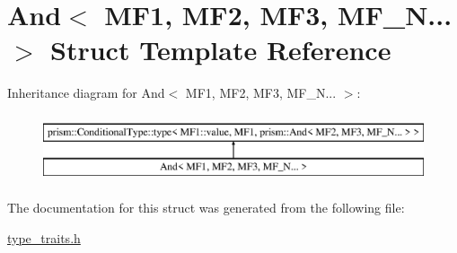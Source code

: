 \hypertarget{struct_and_3_01_m_f1_00_01_m_f2_00_01_m_f3_00_01_m_f___n_8_8_8_01_4}{}\section{And$<$ M\+F1, M\+F2, M\+F3, M\+F\+\_\+N... $>$ Struct Template Reference}
\label{struct_and_3_01_m_f1_00_01_m_f2_00_01_m_f3_00_01_m_f___n_8_8_8_01_4}
Inheritance diagram for And$<$ M\+F1, M\+F2, M\+F3, M\+F\+\_\+N... $>$\+:\begin{figure}[H]
\begin{center}
\leavevmode
\includegraphics[height=2.000000cm]{struct_and_3_01_m_f1_00_01_m_f2_00_01_m_f3_00_01_m_f___n_8_8_8_01_4}
\end{center}
\end{figure}


The documentation for this struct was generated from the following file\+:\begin{DoxyCompactItemize}
\item 
\hyperlink{type__traits_8h}{type\+\_\+traits.\+h}\end{DoxyCompactItemize}
